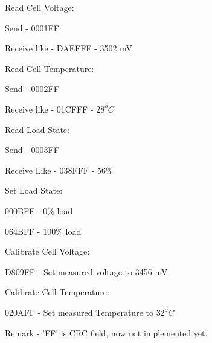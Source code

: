 \documentclass{article}
\begin{document}
Read Cell Voltage:

Send - 0001FF

Receive like - DAEFFF - 3502 mV

Read Cell Temperature:

Send - 0002FF

Receive like - 01CFFF - $28 ^{o}C$

Read Load State:

Send - 0003FF

Receive Like - 038FFF - 56\%

Set Load State:

000BFF - 0\% load

064BFF - 100\% load

Calibrate Cell Voltage:

D809FF - Set measured voltage to 3456 mV

Calibrate Cell Temperature:

020AFF - Set measured Temperature to $32 ^{o}C$


Remark - 'FF' is CRC field, now not implemented yet.
\end{document}
